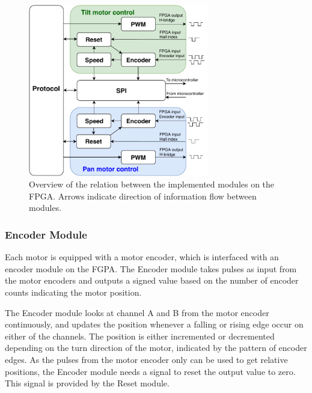 \documentclass[../../main.tex]{subfiles}
\begin{document}
\begin{figure}
    \centering
    \includegraphics[width=0.7\textwidth]{Sections/System_Implementation/Images/FPGALogicBothMotors.pdf}
    \caption{Overview of the relation between the implemented modules on the FPGA. Arrows indicate direction of information flow between modules.}
    \label{fig:FPGALogicBothMotors}
\end{figure}




\subsubsection*{Encoder Module}

Each motor is equipped with a motor encoder, which is interfaced with an encoder module on the FGPA. The Encoder module takes pulses as input from the motor encoders and outputs a signed value based on the number of encoder counts indicating the motor position. 

The Encoder module looks at channel A and B from the motor encoder continuously, and updates the position whenever a falling or rising edge occur on either of the channels. The position is either incremented or decremented depending on the turn direction of the motor, indicated by the pattern of encoder edges.     
As the pulses from the motor encoder only can be used to get relative positions, the Encoder module needs a signal to reset the output value to zero. This signal is provided by the Reset module. 
\end{document}
